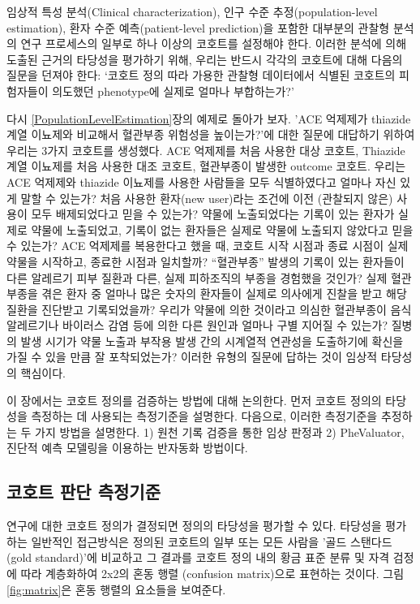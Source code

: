 \documentclass[11pt]{book}
\theoremstyle{definition}
\theoremstyle{definition}
\theoremstyle{definition}
\theoremstyle{remark}
\begin{document}
임상적 특성 분석(Clinical characterization), 인구 수준
추정(population-level estimation), 환자 수준 예측(patient-level
prediction)을 포함한 대부분의 관찰형 분석의 연구 프로세스의 일부로 하나
이상의 코호트를 설정해야 한다. 이러한 분석에 의해 도출된 근거의 타당성을
평가하기 위해, 우리는 반드시 각각의 코호트에 대해 다음의 질문을 던져야
한다: `코호트 정의 따라 가용한 관찰형 데이터에서 식별된 코호트의
피험자들이 의도했던 phenotype에 실제로 얼마나 부합하는가?'

다시 \ref{PopulationLevelEstimation}장의 예제로 돌아가 보자. 'ACE
억제제가 thiazide 계열 이뇨제와 비교해서 혈관부종 위험성을 높이는가?'에
대한 질문에 대답하기 위하여 우리는 3가지 코호트를 생성했다. ACE 억제제를
처음 사용한 대상 코호트, Thiazide 계열 이뇨제를 처음 사용한 대조 코호트,
혈관부종이 발생한 outcome 코호트. 우리는 ACE 억제제와 thiazide 이뇨제를
사용한 사람들을 모두 식별하였다고 얼마나 자신 있게 말할 수 있는가? 처음
사용한 환자(new user)라는 조건에 이전 (관찰되지 않은) 사용이 모두
배제되었다고 믿을 수 있는가? 약물에 노출되었다는 기록이 있는 환자가
실제로 약물에 노출되었고, 기록이 없는 환자들은 실제로 약물에 노출되지
않았다고 믿을 수 있는가? ACE 억제제를 복용한다고 했을 때, 코호트 시작
시점과 종료 시점이 실제 약물을 시작하고, 종료한 시점과 일치할까?
``혈관부종'' 발생의 기록이 있는 환자들이 다른 알레르기 피부 질환과 다른,
실제 피하조직의 부종을 경험했을 것인가? 실제 혈관 부종을 겪은 환자 중
얼마나 많은 숫자의 환자들이 실제로 의사에게 진찰을 받고 해당 질환을
진단받고 기록되었을까? 우리가 약물에 의한 것이라고 의심한 혈관부종이
음식 알레르기나 바이러스 감염 등에 의한 다른 원인과 얼마나 구별 지어질
수 있는가? 질병의 발생 시기가 약물 노출과 부작용 발생 간의 시계열적
연관성을 도출하기에 확신을 가질 수 있을 만큼 잘 포착되었는가? 이러한
유형의 질문에 답하는 것이 임상적 타당성의 핵심이다.

이 장에서는 코호트 정의를 검증하는 방법에 대해 논의한다. 먼저 코호트
정의의 타당성을 측정하는 데 사용되는 측정기준을 설명한다. 다음으로,
이러한 측정기준을 추정하는 두 가지 방법을 설명한다. 1) 원천 기록 검증을
통한 임상 판정과 2) PheValuator, 진단적 예측 모델링을 이용하는 반자동화
방법이다.

\subsection{코호트 판단 측정기준}\label{--}

연구에 대한 코호트 정의가 결정되면 정의의 타당성을 평가할 수 있다.
타당성을 평가하는 일반적인 접근방식은 정의된 코호트의 일부 또는 모든
사람을 '골드 스탠다드(gold standard)'에 비교하고 그 결과를 코호트 정의
내의 황금 표준 분류 및 자격 검정에 따라 계층화하여 2x2의 혼동 행렬
(confusion matrix)으로 표현하는 것이다. 그림 \ref{fig:matrix}은 혼동
행렬의 요소들을 보여준다.
\end{document}
